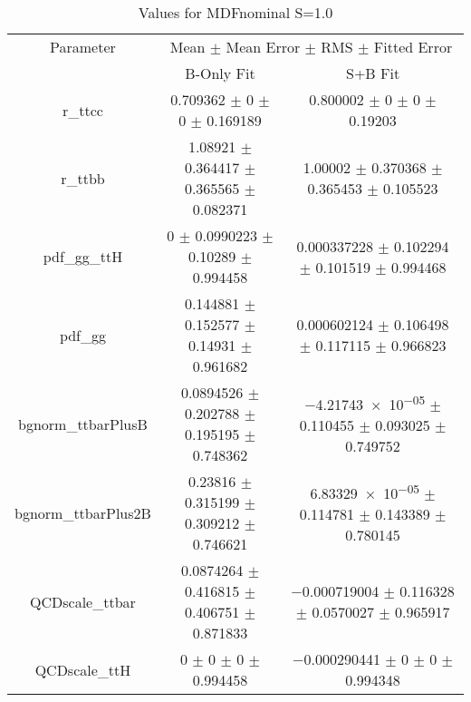 \begin{table}
\centering
\caption{Values for MDFnominal S=1.0}
\begin{tabular}{ccc}
\toprule
Parameter & \multicolumn{2}{c}{Mean $\pm$ Mean Error $\pm$ RMS $\pm$ Fitted Error}\\
 & B-Only Fit & S+B Fit\\
\midrule
r\_ttcc & \num{0.709362} $\pm$ \num{0} $\pm$ \num{0} $\pm$ \num{0.169189} & \num{0.800002} $\pm$ \num{0} $\pm$ \num{0} $\pm$ \num{0.19203}\\
r\_ttbb & \num{1.08921} $\pm$ \num{0.364417} $\pm$ \num{0.365565} $\pm$ \num{0.082371} & \num{1.00002} $\pm$ \num{0.370368} $\pm$ \num{0.365453} $\pm$ \num{0.105523}\\
pdf\_gg\_ttH & \num{0} $\pm$ \num{0.0990223} $\pm$ \num{0.10289} $\pm$ \num{0.994458} & \num{0.000337228} $\pm$ \num{0.102294} $\pm$ \num{0.101519} $\pm$ \num{0.994468}\\
pdf\_gg & \num{0.144881} $\pm$ \num{0.152577} $\pm$ \num{0.14931} $\pm$ \num{0.961682} & \num{0.000602124} $\pm$ \num{0.106498} $\pm$ \num{0.117115} $\pm$ \num{0.966823}\\
bgnorm\_ttbarPlusB & \num{0.0894526} $\pm$ \num{0.202788} $\pm$ \num{0.195195} $\pm$ \num{0.748362} & \num{-4.21743e-05} $\pm$ \num{0.110455} $\pm$ \num{0.093025} $\pm$ \num{0.749752}\\
bgnorm\_ttbarPlus2B & \num{0.23816} $\pm$ \num{0.315199} $\pm$ \num{0.309212} $\pm$ \num{0.746621} & \num{6.83329e-05} $\pm$ \num{0.114781} $\pm$ \num{0.143389} $\pm$ \num{0.780145}\\
QCDscale\_ttbar & \num{0.0874264} $\pm$ \num{0.416815} $\pm$ \num{0.406751} $\pm$ \num{0.871833} & \num{-0.000719004} $\pm$ \num{0.116328} $\pm$ \num{0.0570027} $\pm$ \num{0.965917}\\
QCDscale\_ttH & \num{0} $\pm$ \num{0} $\pm$ \num{0} $\pm$ \num{0.994458} & \num{-0.000290441} $\pm$ \num{0} $\pm$ \num{0} $\pm$ \num{0.994348}\\
\bottomrule
\end{tabular}
\end{table}